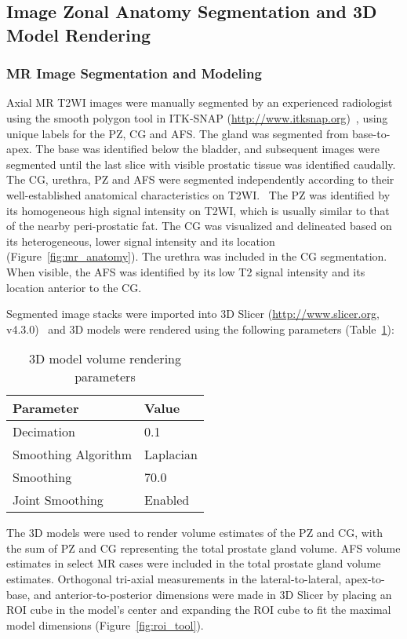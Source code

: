 \subsection{Image Zonal Anatomy Segmentation and 3D Model Rendering}
\subsubsection{MR Image Segmentation and Modeling}
Axial MR T2WI images were manually segmented by an experienced radiologist
using the smooth polygon tool in ITK-SNAP
(\url{http://www.itksnap.org})~\cite{Yushkevich2006}, using unique labels for
the PZ, CG and AFS. The gland was segmented from base-to-apex.  The base was
identified below the bladder, and subsequent images were segmented until the
last slice with visible prostatic tissue was identified caudally. The CG,
urethra, PZ and AFS were segmented independently according to their
well-established anatomical characteristics on
T2WI.~\cite{Barentsz2012,Jung2012,Poon1985,Hricak2007,Bonekamp2011} The PZ was
identified by its homogeneous high signal intensity on T2WI, which is usually
similar to that of the nearby peri-prostatic fat. The CG was visualized and
delineated based on its heterogeneous, lower signal intensity and its location
(Figure~\ref{fig:mr_anatomy}). The urethra was included in the CG segmentation.
When visible, the AFS was identified by its low T2 signal intensity and its
location anterior to the CG. 



Segmented image stacks were imported into 3D Slicer (\url{http://www.slicer.org}, v4.3.0)~\cite{Fedorov2012} and 3D
models were rendered using the following parameters (Table~\ref{tab:3dslicer}):

\begin{table}[h!]
\centering
\caption{3D model volume rendering parameters}
\begin{tabular}{ll}
{\bf Parameter} & {\bf Value} \\ \hline
Decimation & 0.1 \\
Smoothing Algorithm & Laplacian \\
Smoothing  & 70.0 \\
Joint Smoothing & Enabled \\
\end{tabular}
\label{tab:3dslicer}
\end{table}

The 3D models were used to render volume estimates of the PZ and CG, with the
sum of PZ and CG representing the total prostate gland volume. AFS volume
estimates in select MR cases were included in the total prostate gland volume
estimates. Orthogonal tri-axial measurements in the lateral-to-lateral,
apex-to-base, and anterior-to-posterior dimensions were made in 3D Slicer by
placing an ROI cube in the model's center and expanding the ROI cube to fit the
maximal model dimensions (Figure~\ref{fig:roi_tool}). 

